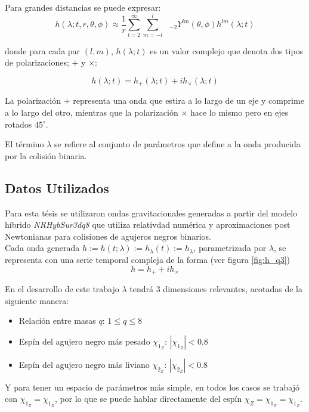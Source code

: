 Para grandes distancias se puede expresar:
\begin{equation}
h( \lambda; t, r, \theta , \phi) \approx \frac{1}{r}  \sum_{l=2}^{\infty}  \sum_{m=-l}^{l} \text{ }_{-2} Y^{lm} (\theta, \phi) h^{lm}(\lambda; t)
\end{equation}

donde para cada par $(l, m)$, $h(\lambda; t)$ es un valor complejo que denota dos tipos de polarizaciones; $+$ y $\times$:

\begin{equation}
h(\lambda; t) = h_{+}(\lambda; t) + i h_{\times}(\lambda; t)
\end{equation}

La polarización $+$ representa una onda que estira a lo largo de un eje y comprime a lo largo del otro, mientras que la polarización $\times$ hace lo mismo pero en ejes rotados $45^{\circ}$.

El término $\lambda$ se refiere al conjunto de parámetros que define a la onda producida por la colisión binaria.


\subsection*{Datos Utilizados}

Para esta tésis se utilizaron ondas gravitacionales generadas a partir del modelo híbrido \textit{NRHybSur3dq8}\cite{Varma_2019} que utiliza relativdad numérica y aproximaciones post Newtonianas para colisiones de agujeros negros binarios.
\\

Cada onda generada \( h := h(t; \lambda) := h_{\lambda}(t) := h_{\lambda} \), parametrizada por $\lambda$, se representa con una serie temporal compleja de la forma (ver figura \ref{fig:h_q3})
\[
h = h_+ + ih_{\times}
\]

En el desarrollo de este trabajo \(\lambda\) tendrá 3 dimensiones relevantes, acotadas de la siguiente manera:

\begin{itemize}
\item Relación entre masas $q$: $1 \le q \le 8$
\item Espín del agujero negro más pesado $\chi_{1_Z}$: $|\chi_{1_Z}| < 0.8$
\item Espín del agujero negro más liviano $\chi_{2_Z}$: $|\chi_{2_Z}| < 0.8$
\end{itemize}

Y para tener un espacio de parámetros más simple, en todos los casos se trabajó con $\chi_{1_Z} = \chi_{1_Z}$, por lo que se puede hablar directamente del espín $\chi_{Z}=\chi_{1_Z} = \chi_{1_Z}$.

